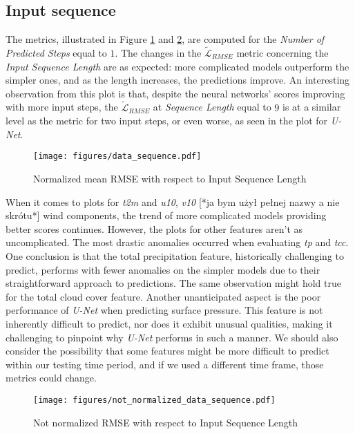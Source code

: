 \FloatBarrier

\subsection{Input sequence}
The metrics, illustrated in Figure \ref{fig:data-sequence-plot} and \ref{fig:not-normalized-data-sequence-plot}, are computed for the \emph{Number of Predicted Steps} equal to $1$.
The changes in the $\tilde{\mathcal{L}}_{RMSE}$ metric concerning the \emph{Input Sequence Length} are as expected: more complicated models outperform the simpler ones, and as the length increases, the predictions improve. An interesting observation from this plot is that, despite the neural networks' scores improving with more input steps, the $\tilde{\mathcal{L}}_{RMSE}$ at \emph{Sequence Length} equal to $9$ is at a similar level as the metric for two input steps, or even worse, as seen in the plot for \emph{U-Net}.

\FloatBarrier

\begin{figure}[!ht]
    \centering
    \texttt{[image: figures/data\_sequence.pdf]}
    \caption{Normalized mean RMSE with respect to Input Sequence Length}
    \label{fig:data-sequence-plot}
\end{figure}

When it comes to plots for \emph{t2m} and \emph{u10}, \emph{v10} [*ja bym użył pełnej nazwy a nie skrótu*] wind components, the trend of more complicated models providing better scores continues. However, the plots for other features aren't as uncomplicated. The most drastic anomalies occurred when evaluating \emph{tp} and \emph{tcc}. One conclusion is that the total precipitation feature, historically challenging to predict, performs with fewer anomalies on the simpler models due to their straightforward approach to predictions. The same observation might hold true for the total cloud cover feature. Another unanticipated aspect is the poor performance of \emph{U-Net} when predicting surface pressure. This feature is not inherently difficult to predict, nor does it exhibit unusual qualities, making it challenging to pinpoint why \emph{U-Net} performs in such a manner.
We should also consider the possibility that some features might be more difficult to predict within our testing time period, and if we used a different time frame, those metrics could change.

\begin{figure}[!ht]
    \centering
    \texttt{[image: figures/not\_normalized\_data\_sequence.pdf]}
    \caption{Not normalized RMSE with respect to Input Sequence Length}
    \label{fig:not-normalized-data-sequence-plot}
\end{figure}


